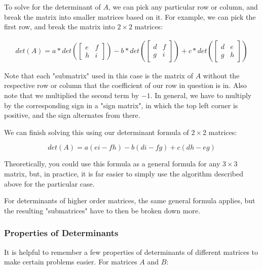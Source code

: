 \documentclass[12pt]{article}
\begin{document}
{To solve for the determinant of $A$, we can pick any particular row or column, and break the matrix into smaller matrices based on it. For example, we can pick the first row, and break the matrix into $2 \times 2$ matrices:

\begin{equation}
    \begin{split}
        det(A) = a*det(\begin{bmatrix}
            e & f\\
            h & i
            \end{bmatrix}) - b*det(\begin{bmatrix}
            d & f\\
            g & i
            \end{bmatrix}) + c*det(\begin{bmatrix}
            d & e\\
            g & h
            \end{bmatrix})
    \end{split}
\end{equation}

Note that each "submatrix" used in this case is the matrix of $A$ without the respective row or column that the coefficient of our row in question is in. Also note that we multiplied the second term by $-1$. In general, we have to multiply by the corresponding sign in a "sign matrix", in which the top left corner is positive, and the sign alternates from there.

We can finish solving this using our determinant formula of $2 \times 2$ matrices:

\[
    det(A) = a(ei - fh) - b(di-fg) + c(dh-eg)
\]

Theoretically, you could use this formula as a general formula for any $3 \times 3$ matrix, but, in practice, it is far easier to simply use the algorithm described above for the particular case.

For determinants of higher order matrices, the same general formula applies, but the resulting "submatrices" have to then be broken down more.

\subsubsection{Properties of Determinants}

It is helpful to remember a few properties of determinants of different matrices to make certain problems easier. For matrices $A$ and $B$:

}
\end{document}
